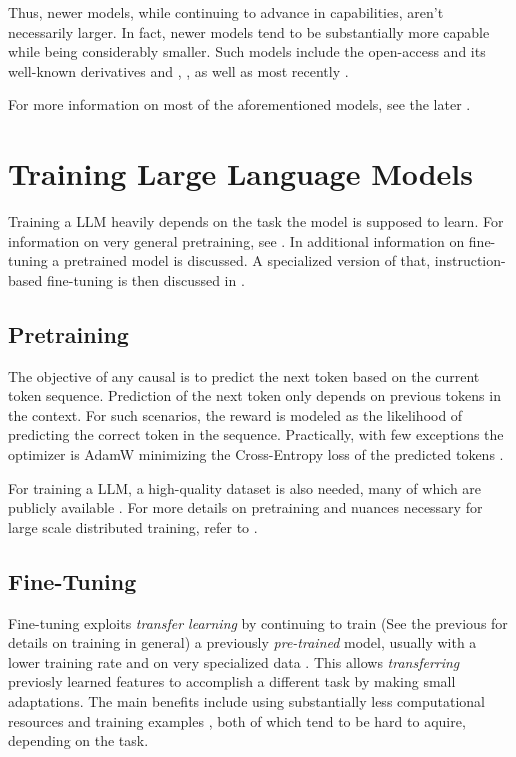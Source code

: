Thus, newer models, while continuing to advance in capabilities, aren't necessarily larger.
In fact, newer models tend to be substantially more capable while being considerably smaller.
Such models include the open-access  and its well-known derivatives  and , , as well as most recently .

For more information on most of the aforementioned models, see the later .


\section{Training Large Language Models}\label{sec:training}
Training a \acrlong{LLM} heavily depends on the task the model is supposed to learn. For information on very general pretraining, see . In  additional information on fine-tuning a pretrained model is discussed. A specialized version of that, instruction-based fine-tuning is then discussed in .


\subsection{Pretraining}\label{sub:pretraining}
The objective of any \gls{causal} is to predict the next token based on the current token sequence.
Prediction of the next token only depends on previous tokens in the context.
For such scenarios, the reward is modeled as the likelihood of predicting the correct token in the sequence.
Practically, with few exceptions the optimizer is AdamW \cite{loshchilov_decoupled_2017} minimizing the Cross-Entropy loss of the predicted tokens \cite{naveed_comprehensive_2023}.

For training a \gls{LLM}, a high-quality dataset is also needed, many of which are publicly available \cite{redpajamadata_2023}.
For more details on pretraining and nuances necessary for large scale distributed training, refer to \cite{tirumala_d4_2023}.

\subsection{Fine-Tuning}\label{sub:finetune}
Fine-tuning exploits \textit{transfer learning} by continuing to train (See the previous  for details on training in general) a previously \textit{pre-trained} model, usually with a lower training rate and on very specialized data \cite{gaddipati_comparative_2020}.
This allows \textit{transferring} previosly learned features to accomplish a different task by making small adaptations.
The main benefits include using substantially less computational resources and training examples \cite{gaddipati_comparative_2020}, both of which tend to be hard to aquire, depending on the task.


